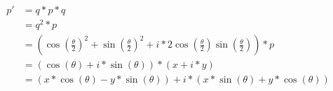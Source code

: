 \begin{equation}
\begin{split}
    p'  &= q*p*q \\
        &= q^2*p \\
        &= (\cos(\frac{\theta}{2})^2 + \sin(\frac{\theta}{2})^2 + i*2\cos(\frac{\theta}{2})\sin(\frac{\theta}{2}))*p \\
        &= (\cos(\theta) + i*\sin(\theta))*(x + i*y) \\
        &= (x*\cos(\theta) - y*\sin(\theta)) + i*(x*\sin(\theta) + y*\cos(\theta)) \\
\end{split}
\end{equation}